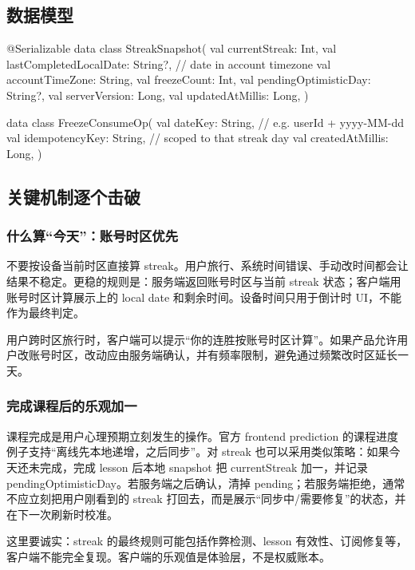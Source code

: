 \subsection{数据模型}

\begin{kotlin}
@Serializable
data class StreakSnapshot(
    val currentStreak: Int,
    val lastCompletedLocalDate: String?, // date in account timezone
    val accountTimeZone: String,
    val freezeCount: Int,
    val pendingOptimisticDay: String?,
    val serverVersion: Long,
    val updatedAtMillis: Long,
)

data class FreezeConsumeOp(
    val dateKey: String,        // e.g. userId + yyyy-MM-dd
    val idempotencyKey: String, // scoped to that streak day
    val createdAtMillis: Long,
)
\end{kotlin}

\subsection{关键机制逐个击破}

\subsubsection{什么算“今天”：账号时区优先}

不要按设备当前时区直接算 streak。用户旅行、系统时间错误、手动改时间都会让结果不稳定。更稳的规则是：服务端返回账号时区与当前 streak 状态；客户端用账号时区计算展示上的 local date 和剩余时间。设备时间只用于倒计时 UI，不能作为最终判定。

用户跨时区旅行时，客户端可以提示“你的连胜按账号时区计算”。如果产品允许用户改账号时区，改动应由服务端确认，并有频率限制，避免通过频繁改时区延长一天。

\subsubsection{完成课程后的乐观加一}

课程完成是用户心理预期立刻发生的操作。\srcofficial 官方 frontend prediction 的课程进度例子支持“离线先本地递增，之后同步”。\srcinferred 对 streak 也可以采用类似策略：如果今天还未完成，完成 lesson 后本地 snapshot 把 currentStreak 加一，并记录 pendingOptimisticDay。若服务端之后确认，清掉 pending；若服务端拒绝，通常不应立刻把用户刚看到的 streak 打回去，而是展示“同步中/需要修复”的状态，并在下一次刷新时校准。

这里要诚实：streak 的最终规则可能包括作弊检测、lesson 有效性、订阅修复等，客户端不能完全复现。客户端的乐观值是体验层，不是权威账本。

